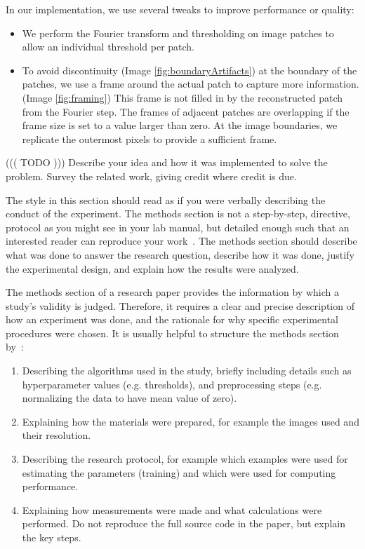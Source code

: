 \documentclass[10pt,conference,compsocconf]{IEEEtran}
\begin{document}
In our implementation, we use several tweaks to improve performance or quality:
\begin{itemize}
\item We perform the Fourier transform and thresholding on image patches to allow an individual threshold per patch.
\item To avoid discontinuity (Image \ref{fig:boundaryArtifacts}) at the boundary of the patches, we use a frame around the actual patch to capture more information. (Image \ref{fig:framing}) This frame is not filled in by the reconstructed patch from the Fourier step. The frames of adjacent patches are overlapping if the frame size is set to a value larger than zero. At the image boundaries, we replicate the outermost pixels to provide a sufficient frame.\end{itemize}
((( TODO )))
Describe your idea and how it was implemented to solve
  the problem. Survey the related work, giving credit where credit is
  due. 
  
  The style in this section should read as if you were verbally
describing the conduct of the experiment. 
The methods section is not a step-by-step, directive,
protocol as you might see in your lab manual, but detailed enough such
that an interested reader can reproduce your
work~\cite{anderson04,wavelab}.
The methods
section should describe what was
done to answer the research question, describe how it was done,
justify the experimental design, and
explain how the results were analyzed.

The methods section of a research paper provides the information by
which a study's validity is judged.
Therefore, it requires a clear and precise description of how an
experiment was done, and the rationale
for why specific experimental procedures were chosen.
It is usually helpful to
structure the methods section by~\cite{kallet04methods}:
\begin{enumerate}
\item Describing the algorithms used in the study, briefly including
  details such as hyperparameter values (e.g. thresholds), and
  preprocessing steps (e.g. normalizing the data to have mean value of
  zero).
\item Explaining how the materials were prepared, for example the
  images used and their resolution.
\item Describing the research protocol, for example which examples
  were used for estimating the parameters (training) and which were
  used for computing performance.
\item Explaining how measurements were made and what
  calculations were performed. Do not reproduce the full source code in
  the paper, but explain the key steps.
\end{enumerate}
\end{document}
